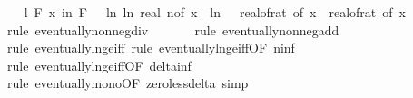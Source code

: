 \begin{isabellebody}
\isanewline
\ \ \isamarkupfalse%
\ l{}{\isacharcolon}{\kern0pt}\ {\isachardoublequoteopen}{\isasymforall}\isactrlsub F\ x\ in\ {\isacharquery}{\kern0pt}F{\isachardot}{\kern0pt}\ {}\ {\isasymle}\ {\isacharparenleft}{\kern0pt}ln\ {\isacharparenleft}{\kern0pt}ln\ {\isacharparenleft}{\kern0pt}real\ {\isacharparenleft}{\kern0pt}n{\isacharunderscore}{\kern0pt}of\ x{\isacharparenright}{\kern0pt}{\isacharparenright}{\kern0pt}{\isacharparenright}{\kern0pt}\ {\isacharplus}{\kern0pt}\ ln\ {\isacharparenleft}{\kern0pt}{}\ {\isacharslash}{\kern0pt}\ real{\isacharunderscore}{\kern0pt}of{\isacharunderscore}{\kern0pt}rat\ {\isacharparenleft}{\kern0pt}{\isasymdelta}{\isacharunderscore}{\kern0pt}of\ x{\isacharparenright}{\kern0pt}{\isacharparenright}{\kern0pt}{\isacharparenright}{\kern0pt}\ {\isacharslash}{\kern0pt}\ {\isacharparenleft}{\kern0pt}real{\isacharunderscore}{\kern0pt}of{\isacharunderscore}{\kern0pt}rat\ {\isacharparenleft}{\kern0pt}{\isasymdelta}{\isacharunderscore}{\kern0pt}of\ x{\isacharparenright}{\kern0pt}{\isacharparenright}{\kern0pt}\isanewline
\ \ \ \ \isamarkupfalse%
\ {\isacharparenleft}{\kern0pt}rule\ eventually{\isacharunderscore}{\kern0pt}nonneg{\isacharunderscore}{\kern0pt}div{\isacharparenright}{\kern0pt}\isanewline
\ \ \ \ \ \isamarkupfalse%
\ {\isacharparenleft}{\kern0pt}rule\ eventually{\isacharunderscore}{\kern0pt}nonneg{\isacharunderscore}{\kern0pt}add{\isacharparenright}{\kern0pt}\isanewline
\ \ \ \ \ \isamarkupfalse%
\ {\isacharparenleft}{\kern0pt}rule\ eventually{\isacharunderscore}{\kern0pt}ln{\isacharunderscore}{\kern0pt}ge{\isacharunderscore}{\kern0pt}iff{\isacharcomma}{\kern0pt}\ rule\ eventually{\isacharunderscore}{\kern0pt}ln{\isacharunderscore}{\kern0pt}ge{\isacharunderscore}{\kern0pt}iff{\isacharbrackleft}{\kern0pt}OF\ n{\isacharunderscore}{\kern0pt}inf{\isacharbrackright}{\kern0pt}{\isacharparenright}{\kern0pt}\isanewline
\ \ \ \ \isamarkupfalse%
\ {\isacharparenleft}{\kern0pt}rule\ eventually{\isacharunderscore}{\kern0pt}ln{\isacharunderscore}{\kern0pt}ge{\isacharunderscore}{\kern0pt}iff{\isacharbrackleft}{\kern0pt}OF\ delta{\isacharunderscore}{\kern0pt}inf{\isacharbrackright}{\kern0pt}{\isacharparenright}{\kern0pt}\isanewline
\ \ \ \ \isamarkupfalse%
\ {\isacharparenleft}{\kern0pt}rule\ eventually{\isacharunderscore}{\kern0pt}mono{\isacharbrackleft}{\kern0pt}OF\ zero{\isacharunderscore}{\kern0pt}less{\isacharunderscore}{\kern0pt}delta{\isacharbrackright}{\kern0pt}{\isacharcomma}{\kern0pt}\ simp{\isacharparenright}{\kern0pt}\isanewline

\end{isabellebody}
